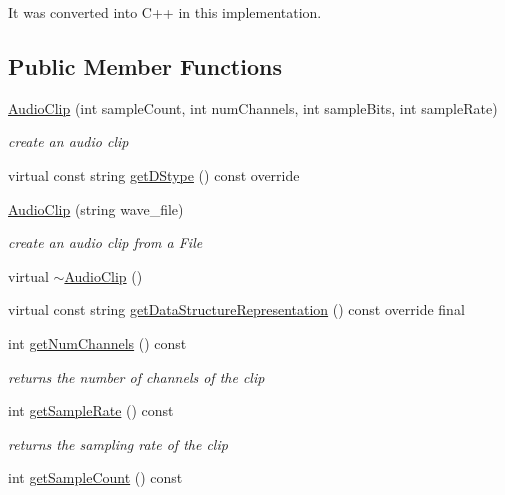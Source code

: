It was converted into C++ in this implementation. \subsection*{Public Member Functions}
\begin{DoxyCompactItemize}
\item 
\hyperlink{classbridges_1_1datastructure_1_1_audio_clip_aa4db655f2e904a30742d45408ff6543c}{Audio\+Clip} (int sample\+Count, int num\+Channels, int sample\+Bits, int sample\+Rate)
\begin{DoxyCompactList}\small\item\em create an audio clip \end{DoxyCompactList}\item 
virtual const string \hyperlink{classbridges_1_1datastructure_1_1_audio_clip_a1fc853180a8d825b2e5ea2d8e3f8e810}{get\+D\+Stype} () const override
\item 
\hyperlink{classbridges_1_1datastructure_1_1_audio_clip_a511ebded2a4d762432d0ebc953791f58}{Audio\+Clip} (string wave\+\_\+file)
\begin{DoxyCompactList}\small\item\em create an audio clip from a File \end{DoxyCompactList}\item 
virtual \hyperlink{classbridges_1_1datastructure_1_1_audio_clip_add941e825645807841afd9653fef4803}{$\sim$\+Audio\+Clip} ()
\item 
virtual const string \hyperlink{classbridges_1_1datastructure_1_1_audio_clip_a9ff485d7b2e0211d9e5c1432d47be617}{get\+Data\+Structure\+Representation} () const override final
\item 
int \hyperlink{classbridges_1_1datastructure_1_1_audio_clip_acc378f797b1b6e3cfb778c1ccdc23dba}{get\+Num\+Channels} () const
\begin{DoxyCompactList}\small\item\em returns the number of channels of the clip \end{DoxyCompactList}\item 
int \hyperlink{classbridges_1_1datastructure_1_1_audio_clip_a520e4a9bbe0685b3598d90668172618c}{get\+Sample\+Rate} () const
\begin{DoxyCompactList}\small\item\em returns the sampling rate of the clip \end{DoxyCompactList}\item 
int \hyperlink{classbridges_1_1datastructure_1_1_audio_clip_aaaee4b34cd512c02a0c0ea072782a9d6}{get\+Sample\+Count} () const

\end{DoxyCompactItemize}
